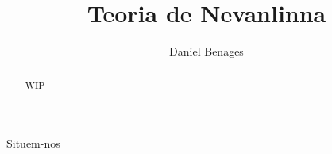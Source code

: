\documentclass[dvipsnames, svgnames]{article}
\title{Teoria de Nevanlinna}
\date{}
\author{Daniel Benages}
\begin{document}
    \maketitle
    \begin{abstract}
        WIP
    \end{abstract}
    Situem-nos 
\end{document}
